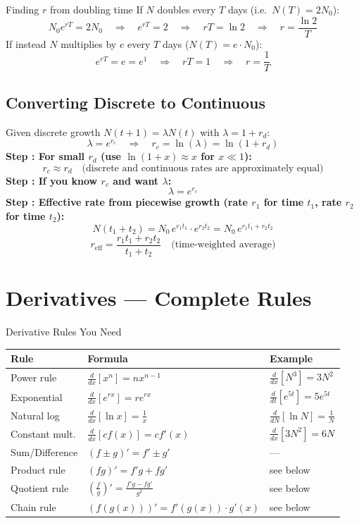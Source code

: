 \documentclass[10pt]{article}
\newcounter{stepnum}
\newcommand{\Step}[1]{%
  \stepcounter{stepnum}%
  \noindent\textcolor{stepblue}{\textbf{Step \thestepnum: #1}}\\[2pt]%
}
\newcommand{\resetsteps}{\setcounter{stepnum}{0}}
\newcommand{\thus}{\quad\Longrightarrow\quad}
\begin{document}
\begin{exbox}{Finding $r$ from doubling time}
If $N$ doubles every $T$ days (i.e.\ $N(T) = 2N_0$):
\[
N_0 e^{rT} = 2N_0 \thus e^{rT} = 2 \thus rT = \ln 2 \thus \boxed{r = \frac{\ln 2}{T}}
\]
If instead $N$ multiplies by $e$ every $T$ days ($N(T) = e \cdot N_0$):
\[
e^{rT} = e = e^1 \thus rT = 1 \thus \boxed{r = \frac{1}{T}}
\]
\end{exbox}

\subsection{Converting Discrete to Continuous}

\resetsteps
\begin{stepbox}
Given discrete growth $N(t+1) = \lambda N(t)$ with $\lambda = 1 + r_d$:
\[
\lambda = e^{r_c} \thus r_c = \ln(\lambda) = \ln(1 + r_d)
\]
\Step{For small $r_d$ (use $\ln(1+x) \approx x$ for $x \ll 1$):}
\[
r_c \approx r_d \quad \text{(discrete and continuous rates are approximately equal)}
\]
\Step{If you know $r_c$ and want $\lambda$:}
\[
\lambda = e^{r_c}
\]
\Step{Effective rate from piecewise growth (rate $r_1$ for time $t_1$, rate $r_2$ for time $t_2$):}
\[
N(t_1+t_2) = N_0\, e^{r_1 t_1}\cdot e^{r_2 t_2} = N_0\, e^{r_1 t_1 + r_2 t_2}
\]
\[
r_{\text{eff}} = \frac{r_1 t_1 + r_2 t_2}{t_1 + t_2} \quad \text{(time-weighted average)}
\]
\end{stepbox}

\section{Derivatives --- Complete Rules}

\begin{rulebox}{Derivative Rules You Need}
\renewcommand{\arraystretch}{1.4}
\begin{tabular}{lll}
\toprule
\textbf{Rule} & \textbf{Formula} & \textbf{Example} \\
\midrule
Power rule & $\frac{d}{dx}[x^n] = nx^{n-1}$ & $\frac{d}{dx}[N^3] = 3N^2$ \\
Exponential & $\frac{d}{dx}[e^{rx}] = re^{rx}$ & $\frac{d}{dt}[e^{5t}] = 5e^{5t}$ \\
Natural log & $\frac{d}{dx}[\ln x] = \frac{1}{x}$ & $\frac{d}{dN}[\ln N] = \frac{1}{N}$ \\
Constant mult. & $\frac{d}{dx}[cf(x)] = cf'(x)$ & $\frac{d}{dx}[3N^2] = 6N$ \\
Sum/Difference & $(f \pm g)' = f' \pm g'$ & ---\\
Product rule & $(fg)' = f'g + fg'$ & see below \\
Quotient rule & $\left(\frac{f}{g}\right)' = \frac{f'g - fg'}{g^2}$ & see below \\
Chain rule & $(f(g(x)))' = f'(g(x))\cdot g'(x)$ & see below \\
\bottomrule
\end{tabular}
\end{rulebox}
\end{document}
